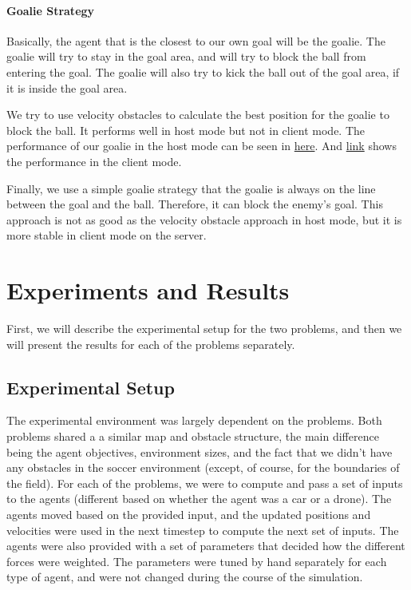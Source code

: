\documentclass[a4paper,12pt]{article}
\begin{document}
\paragraph{Goalie Strategy}
Basically, the agent that is the closest to our own goal will be the goalie. The goalie will try to stay in the goal area, and will try to block the ball from entering the goal. 
The goalie will also try to kick the ball out of the goal area, if it is inside the goal area. 

We try to use velocity obstacles to calculate the best position for the goalie to block the ball. It performs well in host mode but not in client mode. The performance of our goalie in the host mode can be seen in \href{https://youtu.be/coMNcV3A89g}{here}. And \href{https://youtu.be/5VaNUVcJrpA}{link} shows the performance in the client mode.

Finally, we use a simple goalie strategy that the goalie is always on the line between the goal and the ball. Therefore, it can block the enemy's goal.
This approach is not as good as the velocity obstacle approach in host mode, but it is more stable in client mode on the server.




\section{Experiments and Results}
\label{sec:experiments_and_results}

First, we will describe the experimental setup for the two problems, and then we will present the results for each of the problems separately.

\subsection{Experimental Setup}
\label{subsec:experimental_setup}
The experimental environment was largely dependent on the problems. Both problems shared a a similar map and obstacle structure, the main difference being the agent objectives, environment sizes, and the fact that we didn't have any obstacles in the soccer environment (except, of course, for the boundaries of the field). For each of the problems, we were to compute and pass a set of inputs to the agents (different based on whether the agent was a car or a drone). The agents moved based on the provided input, and the updated positions and velocities were used in the next timestep to compute the next set of inputs. The agents were also provided with a set of parameters that decided how the different forces were weighted. The parameters were tuned by hand separately for each type of agent, and were not changed during the course of the simulation.
\end{document}
